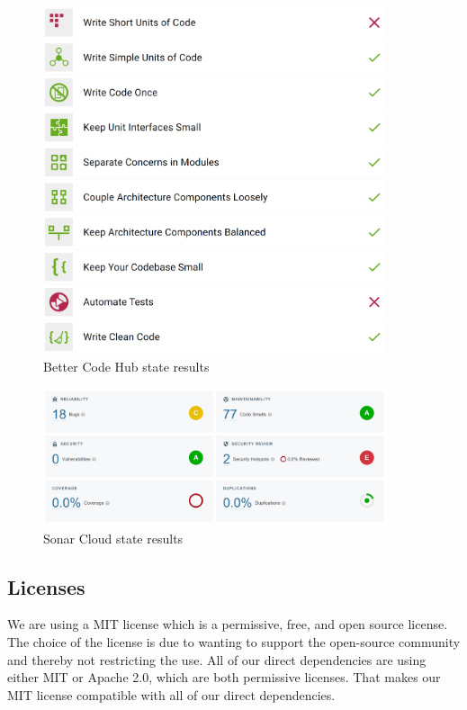 \documentclass[10pt]{article}
\begin{document}
\begin{figure} [H]
  \centering
  \includegraphics[width=0.9\textwidth]{images/bettercodehub.png}
  \caption{Better Code Hub state results}
  \label{fig:bch}
\end{figure}

\begin{figure} [H]
  \centering
  \includegraphics[width=0.9\textwidth]{images/sonarcloud.png}
  \caption{Sonar Cloud state results}
  \label{fig:sc}
\end{figure}


\subsection{Licenses}
We are using a MIT license which is a permissive, free, and open source license. The choice of the license is due to wanting to support the open-source community and thereby not restricting the use. All of our direct dependencies are using either MIT or Apache 2.0, which are both permissive licenses. That makes our MIT license compatible with all of our direct dependencies.
\end{document}
